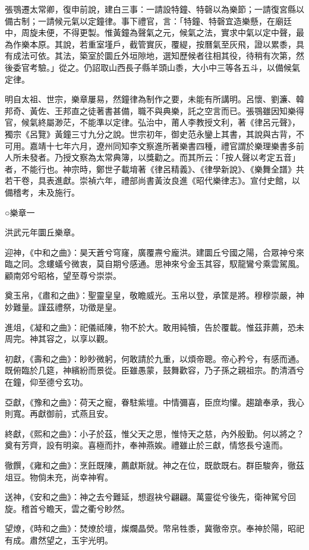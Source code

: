 張鶚遷太常卿，復申前說，建白三事：一請設特鐘、特磬以為樂節；一請復宮縣以備古制；一請候元氣以定鐘律。事下禮官，言：「特鐘、特磬宜造樂懸，在廟廷中，周旋未便，不得更製。惟黃鐘為聲氣之元，候氣之法，實求中氣以定中聲，最為作樂本原。其說，若重室墐戶，截管實灰，覆緹，按曆氣至灰飛，證以累黍，具有成法可依。其法，築室於圜丘外垣隙地，選知歷候者往相其役，待稍有次第，然後委官考驗。」從之。仍詔取山西長子縣羊頭山黍，大小中三等各五斗，以備候氣定律。

明自太祖、世宗，樂章屢易，然鐘律為制作之要，未能有所講明。呂懷、劉濂、韓邦奇、黃佐、王邦直之徒著書甚備，職不與典樂，託之空言而已。張鶚雖因知樂得官，候氣終屬渺茫，不能準以定律。弘治中，莆人李教授文利，著《律呂元聲》，獨宗《呂覽》黃鐘三寸九分之說。世宗初年，御史范永鑾上其書，其說與古背，不可用。嘉靖十七年六月，遼州同知李文察進所著樂書四種，禮官謂於樂理樂書多前人所未發者。乃授文察為太常典簿，以獎勸之。而其所云：「按人聲以考定五音」者，不能行也。神宗時，鄭世子載堉著《律呂精義》、《律學新說》、《樂舞全譜》共若干卷，具表進獻。崇禎六年，禮部尚書黃汝良進《昭代樂律志》。宣付史館，以備稽考，未及施行。


○樂章一

洪武元年圜丘樂章。

迎神，《中和之曲》：昊天蒼兮穹窿，廣覆燾兮龐洪。建圜丘兮國之陽，合眾神兮來臨之同。念螻蟻兮微衷，莫自期兮感通。思神來兮金玉其容，馭龍鸞兮乘雲駕風。顧南郊兮昭格，望至尊兮崇崇。

奠玉帛，《肅和之曲》：聖靈皇皇，敬瞻威光。玉帛以登，承筐是將。穆穆崇嚴，神妙難量。謹茲禮祭，功徵是皇。

進俎，《凝和之曲》：祀儀祗陳，物不於大。敢用純犢，告於覆載。惟茲菲薦，恐未周完。神其容之，以享以觀。

初獻，《壽和之曲》：眇眇微躬，何敢請於九重，以煩帝聰。帝心矜兮，有感而通。既俯臨於几筵，神繽紛而景從。臣雖愚蒙，鼓舞歡容，乃子孫之親祖宗。酌清酒兮在鐘，仰至德兮玄功。

亞獻，《豫和之曲》：荷天之寵，眷駐紫壇。中情彌喜，臣庶均懽。趨蹌奉承，我心則寬。再獻御前，式燕且安。

終獻，《熙和之曲》：小子於茲，惟父天之思，惟恃天之慈，內外殷勤。何以將之？奠有芳齊，設有明粢。喜極而抃，奉神燕娭。禮雖止於三獻，情悠長兮遠而。

徹饌，《雍和之曲》：烹飪既陳，薦獻斯就。神之在位，既歆既右。群臣駿奔，徹茲俎豆。物倘未充，尚幸神宥。

送神，《安和之曲》：神之去兮難延，想遐袂兮翩翩。萬靈從兮後先，衛神駕兮回旋。稽首兮瞻天，雲之衢兮眇然。

望燎，《時和之曲》：焚燎於壇，燦爛晶熒。幣帛牲黍，冀徹帝京。奉神於陽，昭祀有成。肅然望之，玉宇光明。


